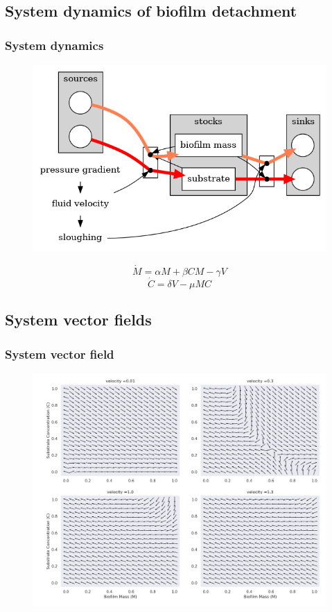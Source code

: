 \documentclass[
	11pt, %
]{beamer}
\begin{document}

\subsection{System dynamics of biofilm detachment}

\begin{frame}
    \frametitle{System dynamics }
	\begin{figure}
		\includegraphics[width=0.7\linewidth]{system_dynamics_diagram.png}
	\end{figure}
	\vspace{-1.5cm}
	\begin{center}
	    \begin{equation*}
            \dot{M}=\alpha M + \beta CM - \gamma V
		\end{equation*}
		\begin{equation*}
            \dot{C}=\delta V - \mu MC
		\end{equation*}
    \end{center}

\end{frame}

\subsection{System vector fields}

\begin{frame}
    \frametitle{System vector field}
	\begin{figure}
		\includegraphics[width=0.8\linewidth]{system_vector_fields.png}
	\end{figure}
\end{frame}
\end{document}
